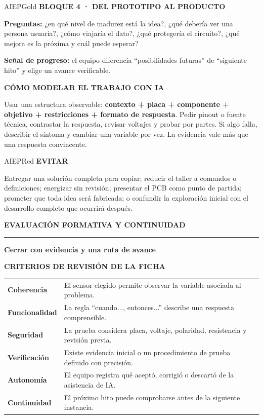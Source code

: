 \documentclass[10pt,a4paper]{article}
\newcommand{\kicker}[1]{%
  {\color{AIEPRed}\scriptsize\bfseries\MakeUppercase{#1}}\par\vspace{2.5mm}
  {\color{AIEPRed}\rule{13mm}{1.2pt}}\vspace{3mm}
}
\newcommand{\labeltext}[1]{%
  {\scriptsize\bfseries\color{AIEPSlate}\MakeUppercase{#1}}\par\vspace{1.2mm}
}
\begin{document}
\begin{softcard}{AIEPGold}
\labeltext{Bloque 4 · Del prototipo al producto}
\textbf{Preguntas:} ¿en qué nivel de madurez está la idea?, ¿qué debería ver una persona usuaria?,
¿cómo viajaría el dato?, ¿qué protegería el circuito?, ¿qué mejora es la próxima y cuál puede esperar?\par
\textbf{Señal de progreso:} el equipo diferencia “posibilidades futuras” de “siguiente hito” y elige
un avance verificable.
\end{softcard}

\begin{card}
\labeltext{Cómo modelar el trabajo con IA}
Usar una estructura observable: \textbf{contexto + placa + componente + objetivo + restricciones +
formato de respuesta}. Pedir pinout o fuente técnica, contrastar la respuesta, revisar voltajes y
probar por partes. Si algo falla, describir el síntoma y cambiar una variable por vez. La evidencia
vale más que una respuesta convincente.
\end{card}

\begin{softcard}{AIEPRed}
\labeltext{Evitar}
Entregar una solución completa para copiar; reducir el taller a comandos o definiciones; energizar
sin revisión; presentar el PCB como punto de partida; prometer que toda idea será fabricada; o
confundir la exploración inicial con el desarrollo completo que ocurrirá después.
\end{softcard}

\newpage
\kicker{Evaluación formativa y continuidad}
{\LARGE\bfseries\color{AIEPNavy}Cerrar con evidencia y una ruta de avance}\par
\vspace{4mm}

\begin{card}
\labeltext{Criterios de revisión de la ficha}
\begin{tabularx}{\textwidth}{@{}L{42mm}Y@{}}
\textbf{Coherencia} & El sensor elegido permite observar la variable asociada al problema.\\
\textbf{Funcionalidad} & La regla “cuando..., entonces...” describe una respuesta comprensible.\\
\textbf{Seguridad} & La prueba considera placa, voltaje, polaridad, resistencia y revisión previa.\\
\textbf{Verificación} & Existe evidencia inicial o un procedimiento de prueba definido con precisión.\\
\textbf{Autonomía} & El equipo registra qué aceptó, corrigió o descartó de la asistencia de IA.\\
\textbf{Continuidad} & El próximo hito puede comprobarse antes de la siguiente instancia.\\
\end{tabularx}
\end{card}
\end{document}
